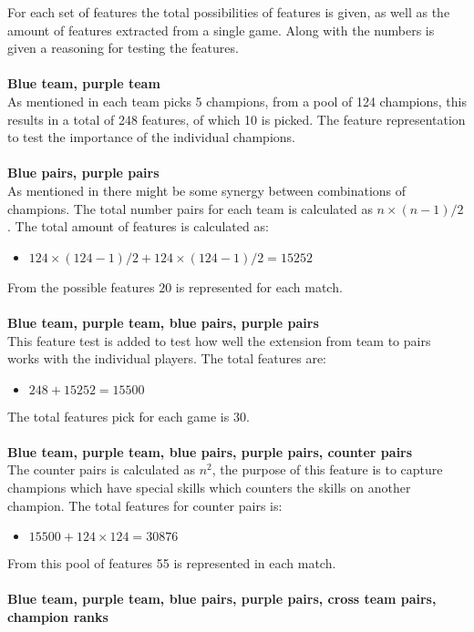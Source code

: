 For each set of features the total possibilities of features is given, as well as the amount of features extracted from a single game. Along with the numbers is given a reasoning for testing the features.  
\\\\
\textbf{Blue team, purple team} \\
As mentioned in  each team picks 5 champions, from a pool of 124 champions, this results in a total of 248 features, of which 10 is picked. The feature representation to test the importance of the individual champions. \\\\
\textbf{Blue pairs, purple pairs} \\
As mentioned in   there might be some synergy between combinations of champions. The total number pairs for each team is calculated as $n \times (n-1)/2$. The total amount of features is calculated as:  
\begin{itemize}
\item $124 \times (124-1)/2 + 124 \times (124-1)/2 = 15252$
\end{itemize}
From the possible features $20$ is represented for each match. \\\\
\textbf{Blue team, purple team, blue pairs, purple pairs} \\
This feature test is added to test how well the extension from team to pairs works with the individual players. The total features are: 
\begin{itemize}
\item $248 + 15252 = 15500$
\end{itemize}
The total features pick for each game is 30.\\\\
\textbf{Blue team, purple team, blue pairs, purple pairs, counter pairs}\\
The counter pairs is calculated as $n^2$, the purpose of this feature is to capture champions which have special skills which counters the skills on another champion. The total features for counter pairs is: 
\begin{itemize}
\item $15500+124\times124 = 30876$
\end{itemize}
From this pool of features 55 is represented in each match.\\\\
\textbf{Blue team, purple team, blue pairs, purple pairs, cross team pairs, champion ranks}\\
